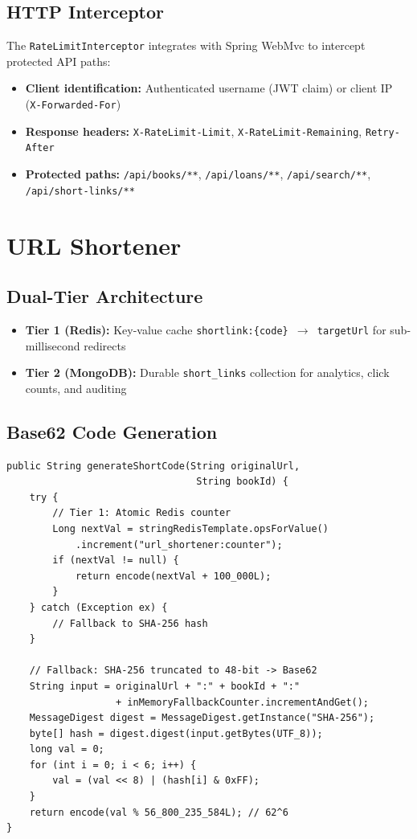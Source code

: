 \documentclass[12pt,a4paper]{report}
\begin{document}
\subsection{HTTP Interceptor}
The \texttt{RateLimitInterceptor} integrates with Spring WebMvc to intercept protected API paths:
\begin{itemize}[noitemsep]
    \item \textbf{Client identification:} Authenticated username (JWT claim) or client IP (\texttt{X-Forwarded-For})
    \item \textbf{Response headers:} \texttt{X-RateLimit-Limit}, \texttt{X-RateLimit-Remaining}, \texttt{Retry-After}
    \item \textbf{Protected paths:} \texttt{/api/books/**}, \texttt{/api/loans/**}, \texttt{/api/search/**}, \texttt{/api/short-links/**}
\end{itemize}

\section{URL Shortener}

\subsection{Dual-Tier Architecture}
\begin{itemize}[noitemsep]
    \item \textbf{Tier 1 (Redis):} Key-value cache \texttt{shortlink:\{code\} $\rightarrow$ targetUrl} for sub-millisecond redirects
    \item \textbf{Tier 2 (MongoDB):} Durable \texttt{short\_links} collection for analytics, click counts, and auditing
\end{itemize}

\subsection{Base62 Code Generation}
\begin{lstlisting}[style=JavaStyle, caption={Base62Service.java -- Short Code Generation}]
public String generateShortCode(String originalUrl,
                                 String bookId) {
    try {
        // Tier 1: Atomic Redis counter
        Long nextVal = stringRedisTemplate.opsForValue()
            .increment("url_shortener:counter");
        if (nextVal != null) {
            return encode(nextVal + 100_000L);
        }
    } catch (Exception ex) {
        // Fallback to SHA-256 hash
    }

    // Fallback: SHA-256 truncated to 48-bit -> Base62
    String input = originalUrl + ":" + bookId + ":"
                   + inMemoryFallbackCounter.incrementAndGet();
    MessageDigest digest = MessageDigest.getInstance("SHA-256");
    byte[] hash = digest.digest(input.getBytes(UTF_8));
    long val = 0;
    for (int i = 0; i < 6; i++) {
        val = (val << 8) | (hash[i] & 0xFF);
    }
    return encode(val % 56_800_235_584L); // 62^6
}
\end{lstlisting}
\end{document}
